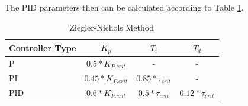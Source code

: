 The PID parameters then can be calculated according to Table \ref{tab:ziegler}.

\begin{table}[H]
\begin{center}
\begin{tabular}{ l | c | c | c}
  Controller Type & $K_p$ & $T_i$ & $T_d$\\
  \hline
  \hline
  P & $0.5 * K_{P.crit}$& - & -\\
  \hline
  PI & $0.45 * K_{P.crit}$ & $0.85 * \tau_{crit}$ & - \\
  \hline
  PID & $0.6 * K_{P.crit}$ & $0.5 * \tau_{crit}$ & $0.12 * \tau_{crit}$\\
  \hline
\end{tabular}
\end{center}
\caption{Ziegler-Nichols Method}
\label{tab:ziegler}
\end{table}
\newpage
